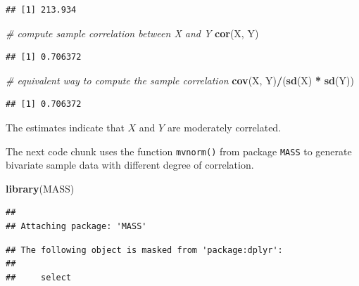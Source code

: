 \documentclass[]{book}
\newenvironment{Shaded}{\begin{snugshade}}{\end{snugshade}}
\newcommand{\KeywordTok}[1]{\textcolor[rgb]{0.13,0.29,0.53}{\textbf{#1}}}
\newcommand{\StringTok}[1]{\textcolor[rgb]{0.31,0.60,0.02}{#1}}
\newcommand{\CommentTok}[1]{\textcolor[rgb]{0.56,0.35,0.01}{\textit{#1}}}
\newcommand{\OperatorTok}[1]{\textcolor[rgb]{0.81,0.36,0.00}{\textbf{#1}}}
\newcommand{\NormalTok}[1]{#1}
\theoremstyle{definition}
\theoremstyle{definition}
\theoremstyle{definition}
\theoremstyle{remark}
\begin{document}
\begin{verbatim}
## [1] 213.934
\end{verbatim}

\begin{Shaded}
\begin{Highlighting}[]
\CommentTok{# compute sample correlation between X and Y}
\KeywordTok{cor}\NormalTok{(X, Y)}
\end{Highlighting}
\end{Shaded}

\begin{verbatim}
## [1] 0.706372
\end{verbatim}

\begin{Shaded}
\begin{Highlighting}[]
\CommentTok{# equivalent way to compute the sample correlation}
\KeywordTok{cov}\NormalTok{(X, Y)}\OperatorTok{/}\NormalTok{(}\KeywordTok{sd}\NormalTok{(X) }\OperatorTok{*}\StringTok{ }\KeywordTok{sd}\NormalTok{(Y))}
\end{Highlighting}
\end{Shaded}

\begin{verbatim}
## [1] 0.706372
\end{verbatim}

The estimates indicate that \(X\) and \(Y\) are moderately correlated.

The next code chunk uses the function \texttt{mvnorm()} from package
\texttt{MASS} to generate bivariate sample data with different degree of
correlation.

\begin{Shaded}
\begin{Highlighting}[]
\KeywordTok{library}\NormalTok{(MASS)}
\end{Highlighting}
\end{Shaded}

\begin{verbatim}
## 
## Attaching package: 'MASS'
\end{verbatim}

\begin{verbatim}
## The following object is masked from 'package:dplyr':
## 
##     select
\end{verbatim}
\end{document}
